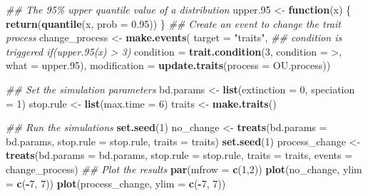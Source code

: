 \documentclass[
]{book}
\newenvironment{Shaded}{\begin{snugshade}}{\end{snugshade}}
\newcommand{\CommentTok}[1]{\textcolor[rgb]{0.56,0.35,0.01}{\textit{#1}}}
\newcommand{\ControlFlowTok}[1]{\textcolor[rgb]{0.13,0.29,0.53}{\textbf{#1}}}
\newcommand{\DataTypeTok}[1]{\textcolor[rgb]{0.13,0.29,0.53}{#1}}
\newcommand{\DecValTok}[1]{\textcolor[rgb]{0.00,0.00,0.81}{#1}}
\newcommand{\FloatTok}[1]{\textcolor[rgb]{0.00,0.00,0.81}{#1}}
\newcommand{\KeywordTok}[1]{\textcolor[rgb]{0.13,0.29,0.53}{\textbf{#1}}}
\newcommand{\NormalTok}[1]{#1}
\newcommand{\OperatorTok}[1]{\textcolor[rgb]{0.81,0.36,0.00}{\textbf{#1}}}
\newcommand{\StringTok}[1]{\textcolor[rgb]{0.31,0.60,0.02}{#1}}
\begin{document}
\begin{Shaded}
\begin{Highlighting}[]
\CommentTok{\#\# The 95\% upper quantile value of a distribution}
\NormalTok{upper}\FloatTok{.95}\NormalTok{ \textless{}{-}}\StringTok{ }\ControlFlowTok{function}\NormalTok{(x) \{}
    \KeywordTok{return}\NormalTok{(}\KeywordTok{quantile}\NormalTok{(x, }\DataTypeTok{prob =} \FloatTok{0.95}\NormalTok{))}
\NormalTok{\} }
\CommentTok{\#\# Create an event to change the trait process}
\NormalTok{change\_process \textless{}{-}}\StringTok{ }\KeywordTok{make.events}\NormalTok{(}
                  \DataTypeTok{target       =} \StringTok{"traits"}\NormalTok{,}
                  \CommentTok{\#\# condition is triggered if(upper.95(x) \textgreater{} 3)}
                  \DataTypeTok{condition    =} \KeywordTok{trait.condition}\NormalTok{(}\DecValTok{3}\NormalTok{, }\DataTypeTok{condition =} \StringTok{\textasciigrave{}}\DataTypeTok{\textgreater{}}\StringTok{\textasciigrave{}}\NormalTok{, }\DataTypeTok{what =}\NormalTok{ upper}\FloatTok{.95}\NormalTok{),}
                  \DataTypeTok{modification =} \KeywordTok{update.traits}\NormalTok{(}\DataTypeTok{process =}\NormalTok{ OU.process))}

\CommentTok{\#\# Set the simulation parameters}
\NormalTok{bd.params \textless{}{-}}\StringTok{ }\KeywordTok{list}\NormalTok{(}\DataTypeTok{extinction =} \DecValTok{0}\NormalTok{, }\DataTypeTok{speciation =} \DecValTok{1}\NormalTok{)}
\NormalTok{stop.rule \textless{}{-}}\StringTok{ }\KeywordTok{list}\NormalTok{(}\DataTypeTok{max.time =} \DecValTok{6}\NormalTok{)}
\NormalTok{traits    \textless{}{-}}\StringTok{ }\KeywordTok{make.traits}\NormalTok{()}

\CommentTok{\#\# Run the simulations}
\KeywordTok{set.seed}\NormalTok{(}\DecValTok{1}\NormalTok{)}
\NormalTok{no\_change \textless{}{-}}\StringTok{ }\KeywordTok{treats}\NormalTok{(}\DataTypeTok{bd.params =}\NormalTok{ bd.params,}
                  \DataTypeTok{stop.rule =}\NormalTok{ stop.rule,}
                  \DataTypeTok{traits    =}\NormalTok{ traits)}
\KeywordTok{set.seed}\NormalTok{(}\DecValTok{1}\NormalTok{)}
\NormalTok{process\_change \textless{}{-}}\StringTok{ }\KeywordTok{treats}\NormalTok{(}\DataTypeTok{bd.params =}\NormalTok{ bd.params,}
                       \DataTypeTok{stop.rule =}\NormalTok{ stop.rule,}
                       \DataTypeTok{traits    =}\NormalTok{ traits,}
                       \DataTypeTok{events    =}\NormalTok{ change\_process)}
\CommentTok{\#\# Plot the results}
\KeywordTok{par}\NormalTok{(}\DataTypeTok{mfrow =} \KeywordTok{c}\NormalTok{(}\DecValTok{1}\NormalTok{,}\DecValTok{2}\NormalTok{))}
\KeywordTok{plot}\NormalTok{(no\_change, }\DataTypeTok{ylim =} \KeywordTok{c}\NormalTok{(}\OperatorTok{{-}}\DecValTok{7}\NormalTok{, }\DecValTok{7}\NormalTok{))}
\KeywordTok{plot}\NormalTok{(process\_change, }\DataTypeTok{ylim =} \KeywordTok{c}\NormalTok{(}\OperatorTok{{-}}\DecValTok{7}\NormalTok{, }\DecValTok{7}\NormalTok{))}
\end{Highlighting}
\end{Shaded}
\end{document}

